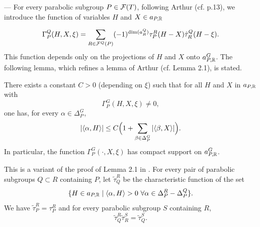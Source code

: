 \begin{paragr} --- For every parabolic subgroup $P\in \mathcal{F}(T)$, following Arthur (cf. \cite{trace_inv} p.13), we introduce the function of variables $H$ and $X\in  a_{P,\mathbb{R}}$

\begin{equation}
  \label{eq:Gamma}
  \Gamma_P^{Q}(H,X,\xi)=\sum_{R\in \mathcal{F}^Q(P)} (-1)^{\dim(a_R^Q)} \tau_P^R(H-X)\hat{\tau}_R^Q(H-\xi).
\end{equation}
This function depends only on the projections of $H$ and $X$ onto $a_{P,\mathbb{R}}^G$. 
The following lemma, which refines a lemma of Arthur (cf. \cite{trace_inv} Lemma 2.1), is stated.

\begin{lemme}\label{lem:maj-support}
  There exists a constant $C>0$ (depending on $\xi$) such that for all $H$ and $X$ in $a_{P,\mathbb{R}}$ with 
$$\Gamma_P^{G}(H,X,\xi)\neq 0,$$
one has, for every $\alpha\in \Delta_P^G$,
$$|\langle \alpha, H\rangle| \leq C\Bigl(1+\sum_{\beta\in \Delta_P^G} |\langle \beta, X\rangle|\Bigr).$$
In particular, the function $\Gamma_P^{G}(\cdot,X,\xi)$ has compact support on $a_{P,\mathbb{R}}^G$.
\end{lemme}

\begin{preuve}
This is a variant of the proof of Lemma 2.1 in \cite{trace_inv}. For every pair of parabolic subgroups $Q\subset R$ containing $P$, let $\tilde{\tau}_{Q}^{R}$ be the characteristic function of the set 
$$\{H \in a_{P,\mathbb{R}}\mid \langle \alpha, H\rangle >0 \  \forall \alpha \in \Delta_P^R-\Delta_P^Q \}.$$
We have $\tilde{\tau}_{P}^{R}=\tau_P^R$ and for every parabolic subgroup $S$ containing $R$,
$$   \tilde{\tau}_{Q}^{R}\tilde{\tau}_{R}^{S}=\tilde{\tau}_{Q}^{S} .$$


\end{preuve}
\end{paragr}
